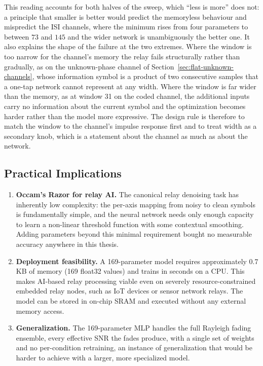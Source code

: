 This reading accounts for both halves of the sweep, which ``less is more'' does not: a principle that smaller is better would predict the memoryless behaviour and mispredict the ISI channels, where the minimum rises from four parameters to between $73$ and $145$ and the wider network is unambiguously the better one. It also explains the shape of the failure at the two extremes. Where the window is too narrow for the channel's memory the relay fails structurally rather than gradually, as on the unknown-phase channel of Section~\ref{sec:flat-unknown-channels}, whose information symbol is a product of two consecutive samples that a one-tap network cannot represent at any width. Where the window is far wider than the memory, as at window 31 on the coded channel, the additional inputs carry no information about the current symbol and the optimization becomes harder rather than the model more expressive. The design rule is therefore to match the window to the channel's impulse response first and to treat width as a secondary knob, which is a statement about the channel as much as about the network.

\subsection{Practical Implications}\label{sec:practical-implications}

\begin{enumerate}
\def\labelenumi{\arabic{enumi}.}
\item
  \textbf{Occam's Razor for relay AI.} The canonical relay denoising task has inherently low complexity: the per-axis mapping from noisy to clean symbols is fundamentally simple, and the neural network needs only enough capacity to learn a non-linear threshold function with some contextual smoothing. Adding parameters beyond this minimal requirement bought no measurable accuracy anywhere in this thesis.
\item
  \textbf{Deployment feasibility.} A 169-parameter model requires approximately 0.7 KB of memory (169 float32 values) and trains in seconds on a CPU. This makes AI-based relay processing viable even on severely resource-constrained embedded relay nodes, such as IoT devices or sensor network relays. The model can be stored in on-chip SRAM and executed without any external memory access.
\item
  \textbf{Generalization.} The 169-parameter MLP handles the full Rayleigh fading ensemble, every effective SNR the fades produce, with a single set of weights and no per-condition retraining, an instance of generalization that would be harder to achieve with a larger, more specialized model.
\end{enumerate}

